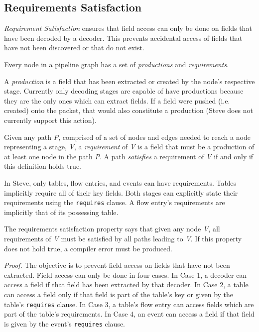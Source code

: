 \subsection{Requirements Satisfaction} \label{guide:requirements}

\textit{Requirement Satisfaction} ensures that field access can only be done on fields that have been decoded by a decoder. This prevents accidental access of fields that have not been discovered or that do not exist.

Every node in a pipeline graph has a set of \textit{productions} and \textit{requirements}.

A \textit{production} is a field that has been extracted or created by the node's respective stage. Currently only decoding stages are capable of have productions because they are the only ones which can extract fields. If a field were pushed (i.e. created) onto the packet, that would also constitute a production (Steve does not currently support this action).

Given any path \textit{P}, comprised of a set of nodes and edges needed to reach a node representing a stage, \textit{V}, a \textit{requirement} of \textit{V} is a field that must be a production of at least one node in the path \textit{P}. A path \textit{satisfies} a requirement of \textit{V} if and only if this definition holds true.

In Steve, only tables, flow entries, and events can have requirements. Tables implicitly require all of their key fields. Both stages can explicitly state their requirements using the \texttt{requires} clause. A flow entry's requirements are implicitly that of its possessing table.

The requirements satisfaction property says that given any node \textit{V}, all requirements of \textit{V} must be satisfied by all paths leading to \textit{V}. If this property does not hold true, a compiler error must be produced.

\textit{Proof.} 
The objective is to prevent field access on fields that have not been extracted. Field access can only be done in four cases. In Case 1, a decoder can access a field if that field has been extracted by that decoder. In Case 2, a table can access a field only if that field is part of the table's key or given by the table's \texttt{requires} clause. In Case 3, a table's flow entry can access fields which are part of the table's requirements. In Case 4, an event can access a field if that field is given by the event's \texttt{requires} clause.

